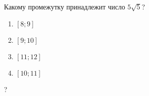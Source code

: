 \begin{ex}
	Какому промежутку принадлежит число \(5\sqrt{5}\)?
	
	\selectanswer
	\begin{multicols}{4}
		\begin{enumerate}[label=\arabic*)]
			\item $[8;9]$
			\item $[9;10]$
			\item $[11;12]$
			\item $[10;11]$
		\end{enumerate}
	\end{multicols}
	\begin{answer}
		?
	\end{answer}
\end{ex}